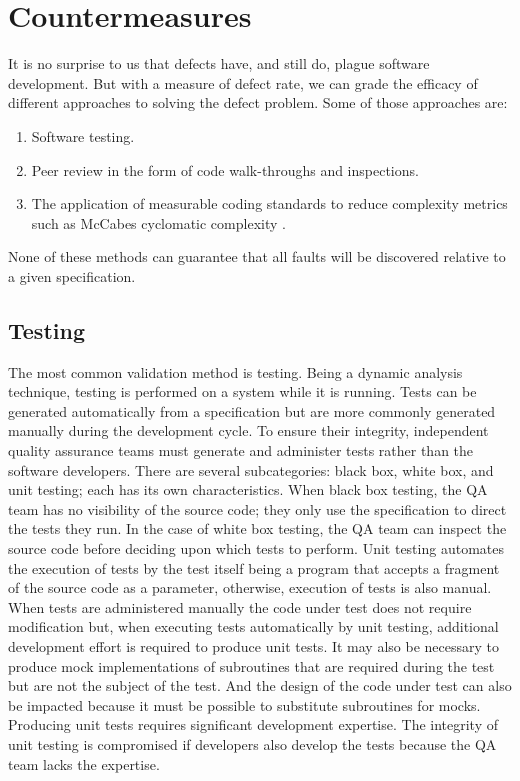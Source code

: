 \section{Countermeasures}

It is no surprise to us that defects have, and still do, plague software development.  But with a measure of defect rate, we can grade the efficacy of different approaches to solving the defect problem.  Some of those approaches are:

\begin{enumerate}
\item Software testing.
\item Peer review in the form of code walk-throughs and inspections.
\item The application of measurable coding standards to reduce complexity metrics such as McCabes cyclomatic complexity \cite{CodeCompleteMcCabe}.
\end{enumerate}

\noindent None of these methods can guarantee that all faults will be discovered relative to a given specification.\\

\subsection{Testing}
\label{subSec:Testing}

The most common validation method is testing.  Being a dynamic analysis technique, testing is performed on a system while it is running.  Tests can be generated automatically from a specification but are more commonly generated manually during the development cycle.  To ensure their integrity, independent quality assurance teams must generate and administer tests rather than the software developers.  There are several subcategories: black box, white box, and unit testing; each has its own characteristics.  When black box testing, the QA team has no visibility of the source code; they only use the specification to direct the tests they run.  In the case of white box testing, the QA team can inspect the source code before deciding upon which tests to perform.  Unit testing automates the execution of tests by the test itself being a program that accepts a fragment of the source code as a parameter, otherwise, execution of tests is also manual.  When tests are administered manually the code under test does not require modification but, when executing tests automatically by unit testing, additional development effort is required to produce unit tests.  It may also be necessary to produce mock implementations of subroutines that are required during the test but are not the subject of the test.  And the design of the code under test can also be impacted because it must be possible to substitute subroutines for mocks.  Producing unit tests requires significant development expertise.  The integrity of unit testing is compromised if developers also develop the tests because the QA team lacks the expertise.

